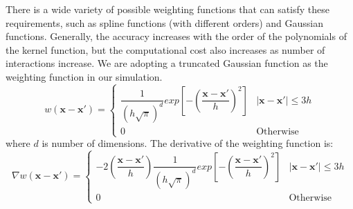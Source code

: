 \documentclass[gmd, manuscript]{copernicus}
\begin{document}
There is a wide variety of possible weighting functions that can satisfy these requirements, such as spline functions (with different orders) and Gaussian functions. Generally, the accuracy increases with the order of the polynomials of the kernel function, but the computational cost also increases as number of interactions increase. 
We are adopting a truncated Gaussian function as the weighting function in our simulation.
\begin{equation}
w\left(\textbf{x} - \textbf{x} \prime \right) = 
\begin{cases} 
      \dfrac{1}{\left(h \sqrt{\pi}\right)^d} exp \left[- \left(\dfrac{\textbf{x} - \textbf{x} \prime}{h} \right)^2 \right] &  \vert \textbf{x} - \textbf{x} \prime \vert \leq 3h\\
      0 & \text{Otherwise}
\end{cases}
\label{eq:SPH-kernel}
\end{equation}
where $d$ is number of dimensions.
The derivative of the weighting function is:
\begin{equation}
\nabla w\left(\textbf{x} - \textbf{x} \prime \right) = 
\begin{cases} 
      -2\left(\dfrac{\textbf{x} - \textbf{x} \prime}{h}\right) \dfrac{1}{\left(h \sqrt{\pi}\right)^d} exp \left[- \left(\dfrac{\textbf{x} - \textbf{x} \prime}{h}\right)^2 \right] &  \vert \textbf{x} - \textbf{x} \prime \vert \leq 3h\\
      0 & \text{Otherwise}
\end{cases}
\label{eq:SPH-kernel-gradient}
\end{equation}
\end{document}
